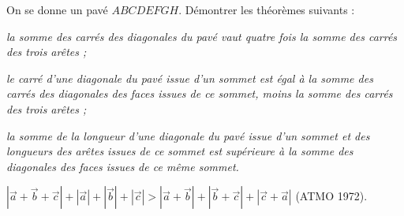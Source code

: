 On se donne un pavé $ABCDEFGH$. Démontrer les théorèmes suivants :

\emph{la somme des carrés des diagonales du pavé vaut quatre fois la somme des carrés des trois arêtes ;}

\emph{le carré d'une diagonale du pavé issue d'un sommet est égal à la somme des carrés des diagonales des faces issues de ce sommet, moins la somme des carrés des trois arêtes ;}

\emph{la somme de la longueur d'une diagonale du pavé issue d'un sommet et des longueurs des arêtes issues de ce sommet est supérieure à la somme des diagonales des faces issues de ce même sommet.}

$|\vec a + \vec b + \vec c| + |\vec a| + |\vec b| + |\vec c| > |\vec a + \vec b| + |\vec b + \vec c| + |\vec c + \vec a|$ (ATMO 1972).

